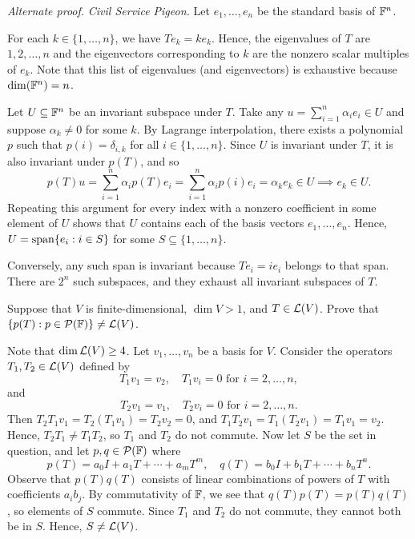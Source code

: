 \begin{exc}
\begin{solution}
\emph{Alternate proof.} \emph{Civil Service Pigeon.} Let $e_1,\dots,e_n$ be
the standard basis of $\mathbb{F}^n$.
\begin{parts}
\item For each $k\in\{1,\dots,n\}$, we have $Te_k=ke_k$. Hence, the eigenvalues
  of $T$ are $1,2,\dots,n$ and the eigenvectors corresponding to $k$ are the
  nonzero scalar multiples of $e_k$. Note that this list of eigenvalues (and
  eigenvectors) is exhaustive because $\operatorname{dim}(\mathbb{F}^n)=n$.
\item Let $U\subseteq\mathbb{F}^n$ be an invariant subspace under $T$. Take any
  $u=\sum_{i=1}^n\alpha_ie_i\in U$ and suppose $\alpha_k\ne0$ for some $k$. By
  Lagrange interpolation, there exists a polynomial $p$ such that
  $p(i)=\delta_{i,k}$ for all $i\in\{1,\dots,n\}$. Since $U$ is invariant under
  $T$, it is also invariant under $p(T)$, and so
  \[ p(T)u = \sum_{i=1}^n\alpha_ip(T)e_i = \sum_{i=1}^n\alpha_ip(i)e_i
     = \alpha_ke_k\in U \implies e_k\in U. \]
  Repeating this argument for every index with a nonzero coefficient in some
  element of $U$ shows that $U$ contains each of the basis vectors
  $e_1,\dots,e_n$. Hence, $U=\operatorname{span}\{e_i : i\in S\}$ for some
  $S\subseteq\{1,\dots,n\}$.

  Conversely, any such span is invariant because $Te_i=ie_i$ belongs to that
  span. There are $2^n$ such subspaces, and they exhaust all invariant
  subspaces of $T$. \qedhere
\end{parts}
\end{solution}

\begin{exercise}
Suppose that $V$ is finite-dimensional, $\dim V>1$, and $T\in\mathcal{L}(V)$. Prove
that
$\{p(T) : p\in\mathcal{P}(\mathbb{F})\}\ne\mathcal{L}(V)$.
\end{exercise}
\begin{solution}
Note that $\operatorname{dim}\mathcal{L}(V)\ge4$. Let $v_1,\dots,v_n$ be a basis for $V$. Consider
the operators $T_1,T_2\in\mathcal{L}(V)$ defined by
\[ T_1v_1=v_2,\quad T_1v_i=0\text{ for } i=2,\dots,n, \]
and
\[ T_2v_1=v_1,\quad T_2v_i=0\text{ for } i=2,\dots,n. \]
Then $T_2T_1v_1=T_2(T_1v_1)=T_2v_2=0$, and $T_1T_2v_1=T_1(T_2v_1)=T_1v_1=v_2$.
Hence, $T_2T_1\ne T_1T_2$, so $T_1$ and $T_2$ do not commute. Now let $S$ be
the set in question, and let $p,q\in\mathcal{P}(\mathbb{F})$ where
\[ p(T)=a_0I+a_1T+\cdots+a_mT^m,\quad q(T)=b_0I+b_1T+\cdots+b_nT^n. \]
Observe that $p(T)q(T)$ consists of linear combinations of powers of $T$ with
coefficients $a_ib_j$. By commutativity of $\mathbb{F}$, we see that
$q(T)p(T)=p(T)q(T)$, so elements of $S$ commute. Since $T_1$ and $T_2$ do not
commute, they cannot both be in $S$. Hence, $S\ne\mathcal{L}(V)$.
\end{solution}
\end{exc}
